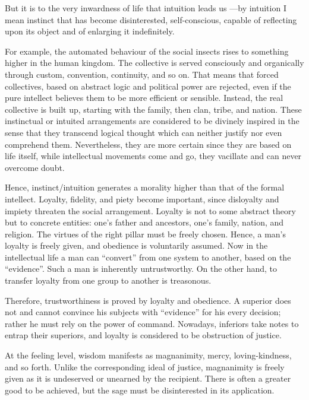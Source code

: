 \begin{quotex}
But it is to the very inwardness of life that intuition leads us ---by intuition I mean instinct that has become disinterested, self-conscious, capable of reflecting upon its object and of enlarging it indefinitely.
\end{quotex}


For example, the automated behaviour of the social insects rises to something higher in the human kingdom. The collective is served consciously and organically through custom, convention, continuity, and so on. That means that forced collectives, based on abstract logic and political power are rejected, even if the pure intellect believes them to be more efficient or sensible. Instead, the real collective is built up, starting with the family, then clan, tribe, and nation. These instinctual or intuited arrangements are considered to be divinely inspired in the sense that they transcend logical thought which can neither justify nor even comprehend them. Nevertheless, they are more certain since they are based on life itself, while intellectual movements come and go, they vacillate and can never overcome doubt.

Hence, instinct/intuition generates a morality higher than that of the formal intellect. Loyalty, fidelity, and piety become important, since disloyalty and impiety threaten the social arrangement. Loyalty is not to some abstract theory but to concrete entities: one's father and ancestors, one's family, nation, and religion. The virtues of the right pillar must be freely chosen. Hence, a man's loyalty is freely given, and obedience is voluntarily assumed. Now in the intellectual life a man can ``convert'' from one system to another, based on the ``evidence''. Such a man is inherently untrustworthy. On the other hand, to transfer loyalty from one group to another is treasonous.

Therefore, trustworthiness is proved by loyalty and obedience. A superior does not and cannot convince his subjects with ``evidence'' for his every decision; rather he must rely on the power of command. Nowadays, inferiors take notes to entrap their superiors, and loyalty is considered to be obstruction of justice.

At the feeling level, wisdom manifests as magnanimity, mercy, loving-kindness, and so forth. Unlike the corresponding ideal of justice, magnanimity is freely given as it is undeserved or unearned by the recipient. There is often a greater good to be achieved, but the sage must be disinterested in its application.

